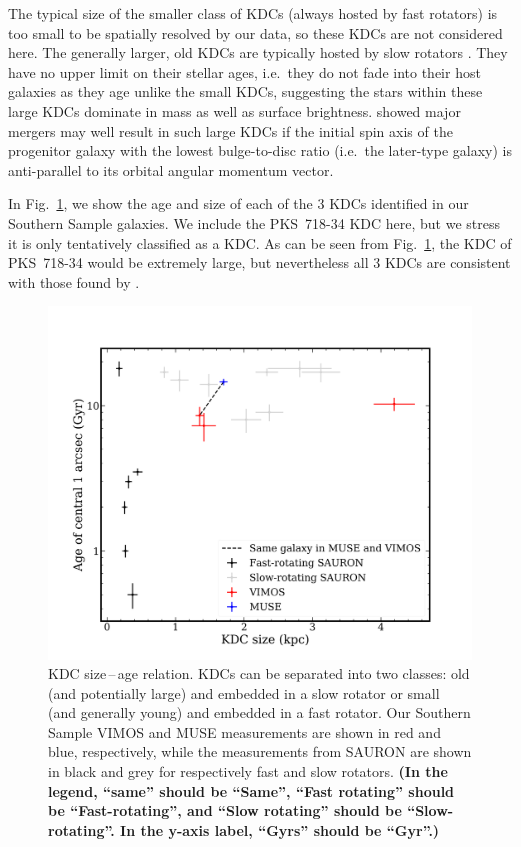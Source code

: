\documentclass[a4paper,fleqn,usenatbib]{mnras}
\begin{document}
The typical size of the smaller class of KDCs (always hosted by fast
rotators) is too small to be spatially resolved by our data, so these
KDCs are not considered here. The generally larger, old KDCs are
typically hosted by slow rotators \citep{Kuntschner2010}. They have no
upper limit on their stellar ages, i.e.\ they do not fade into their
host galaxies as they age unlike the small KDCs, suggesting the stars
within these large KDCs dominate in mass as well as surface
brightness. \citet{Bois2011} showed major mergers may well result in
such large KDCs if the initial spin axis of the progenitor galaxy with
the lowest bulge-to-disc ratio (i.e.\ the later-type galaxy) is
anti-parallel to its orbital angular momentum vector.

In Fig.~\ref{fig:KDC}, we show the age and size of each of the $3$
KDCs identified in our Southern Sample galaxies. We include the
PKS~718-34 KDC here, but we stress it is only tentatively classified
as a KDC. As can be seen from Fig.~\ref{fig:KDC}, the KDC of
PKS~718-34 would be extremely large, but nevertheless all $3$ KDCs are
consistent with those found by \citet{Kuntschner2010}.

\begin{figure}
  \includegraphics[width=\columnwidth]{KDC_size_age.png}
  \caption[KDC dichotomy]{KDC size\,--\,age relation. KDCs can be
    separated into two classes: old (and potentially large) and
    embedded in a slow rotator or small (and generally young) and
    embedded in a fast rotator. Our Southern Sample VIMOS and MUSE
    measurements are shown in red and blue, respectively, while the
    measurements from SAURON \citep{Kuntschner2010} are shown in black
    and grey for respectively fast and slow rotators. {\bf (In the
      legend, ``same'' should be ``Same'', ``Fast rotating'' should be
      ``Fast-rotating'', and ``Slow rotating'' should be
      ``Slow-rotating''. In the y-axis label, ``Gyrs'' should be
      ``Gyr''.)}}
  \label{fig:KDC}
\end{figure}
\end{document}
